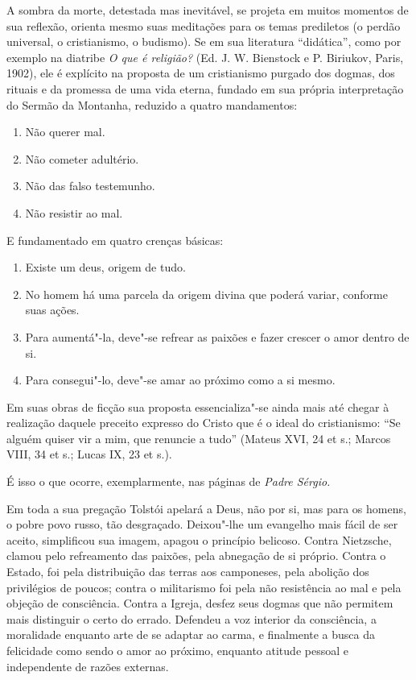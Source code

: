 A sombra da morte, detestada mas inevitável, se projeta em muitos
momentos de sua reflexão, orienta mesmo suas meditações para os temas
prediletos (o perdão universal, o cristianismo, o budismo). Se em sua
literatura ``didática'', como por exemplo na diatribe \emph{O que é
religião?} (Ed. J. W. Bienstock e P. Biriukov, Paris, 1902), ele é
explícito na proposta de um cristianismo purgado dos dogmas, dos rituais
e da promessa de uma vida eterna, fundado em sua própria interpretação
do Sermão da Montanha, reduzido a quatro mandamentos:

\begin{enumerate}
\def\labelenumi{\arabic{enumi})}
\item
  Não querer mal.
\item
  Não cometer adultério.
\item
  Não das falso testemunho.
\item
  Não resistir ao mal.
\end{enumerate}

E fundamentado em quatro crenças básicas:

\begin{enumerate}
\def\labelenumi{\arabic{enumi})}
\item
  Existe um deus, origem de tudo.
\item
  No homem há uma parcela da origem divina que poderá variar, conforme
  suas ações.
\item
  Para aumentá"-la, deve"-se refrear as paixões e fazer crescer o amor
  dentro de si.
\item
  Para consegui"-lo, deve"-se amar ao próximo como a si mesmo.
\end{enumerate}

Em suas obras de ficção sua proposta essencializa"-se ainda mais até
chegar à realização daquele preceito expresso do Cristo que é o ideal do
cristianismo: ``Se alguém quiser vir a mim, que renuncie a tudo''
(Mateus XVI, 24 et s.; Marcos VIII, 34 et s.; Lucas IX, 23 et s.).

É isso o que ocorre, exemplarmente, nas páginas de \emph{Padre Sérgio.}

Em toda a sua pregação Tolstói apelará a Deus, não por si, mas para os
homens, o pobre povo russo, tão desgraçado. Deixou"-lhe um evangelho mais
fácil de ser aceito, simplificou sua imagem, apagou o princípio
belicoso. Contra Nietzsche, clamou pelo refreamento das paixões, pela
abnegação de si próprio. Contra o Estado, foi pela distribuição das
terras aos camponeses, pela abolição dos privilégios de poucos; contra o
militarismo foi pela não resistência ao mal e pela objeção de
consciência. Contra a Igreja, desfez seus dogmas que não permitem mais
distinguir o certo do errado. Defendeu a voz interior da consciência, a
moralidade enquanto arte de se adaptar ao carma, e finalmente a busca da
felicidade como sendo o amor ao próximo, enquanto atitude pessoal e
independente de razões externas.


